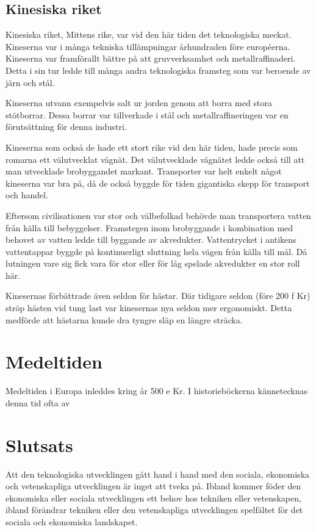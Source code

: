 \documentclass[a4paper,12pt,fleqn]{article}
\begin{document}
\subsection{Kinesiska riket}

Kinesiska riket, Mittens rike, var vid den här tiden det teknologiska meckat. Kineserna var i många tekniska tillämpningar århundraden före européerna. Kineserna var framförallt bättre på att gruvverksamhet och metallraffinaderi. Detta i sin tur ledde till många andra teknologiska framsteg som var beroende av järn och stål. 

Kineserna utvann exempelvis salt ur jorden genom att borra med stora stötborrar. Dessa borrar var tillverkade i stål och metallraffineringen var en förutsättning för denna industri. 

Kineserna som också de hade ett stort rike vid den här tiden, hade precis som romarna ett välutvecklat vägnät. Det välutvecklade vägnätet ledde också till att man utvecklade brobyggandet markant. Transporter var helt enkelt något kineserna var bra på, då de också byggde för tiden gigantiska skepp för transport och handel. 

Eftersom civilisationen var stor och välbefolkad behövde man transportera vatten från källa till bebyggelser. Framstegen inom brobyggande i kombination med behovet av vatten ledde till byggande av akvedukter. Vattentrycket i antikens vattentappar byggde på kontinuerligt sluttning hela vägen från källa till mål. Då lutningen vare sig fick vara för stor eller för låg spelade akvedukter en stor roll här. 

Kinesernas förbättrade även seldon för hästar. Där tidigare seldon (före 200 f Kr) ströp hästen vid tung last var kinesernas nya seldon mer ergonomiskt. Detta medförde att hästarna kunde dra tyngre släp en längre sträcka. 

\newpage
\section{Medeltiden}

Medeltiden i Europa inleddes kring år 500 e Kr. I historieböckerna kännetecknas denna tid ofta av 


\newpage

\section{Slutsats}

Att den teknologiska utvecklingen gått hand i hand med den sociala, ekonomiska och vetenskapliga utvecklingen är inget att tveka på. Ibland kommer föder den ekonomiska eller sociala utvecklingen ett behov hos tekniken eller vetenskapen, ibland förändrar tekniken eller den vetenskapliga utvecklingen spelfältet för det sociala och ekonomiska landskapet. 
\end{document}
